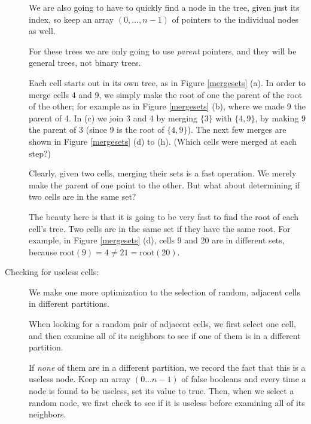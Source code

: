 \documentclass{article}
\newcommand{\set}[1]{\ensuremath{\{#1\}}}
\begin{document}
\begin{description}
  We are also going to have to quickly find a node in the tree, given
  just its index, so keep an array $(0,\ldots,n-1)$ of pointers to the
  individual nodes as well.

For these trees we are only going to use {\em parent} pointers, and
they will be general trees, not binary trees.

  Each cell starts out in its own tree, as in Figure \ref{mergesets}
  (a).  In order to merge cells 4 and 9, we simply make the root of one
  the parent of the root of the other; for example as in Figure
  \ref{mergesets} (b), where we made 9 the parent of 4.  In (c) we
  join 3 and 4 by 
  merging \set{3} with \set{4,9}, by making 9 the parent of 3 (since 9
  is the root of \set{4,9}).
  The next few merges are shown in Figure
  \ref{mergesets} (d) to (h).  (Which cells were merged at each step?)

Clearly, given two cells, merging their sets is a fast operation.  We
merely make the parent of one point to the other.  But what about
determining if two cells are in the same set?

The beauty here is that it is going to be very fast to find the root
of each cell's tree.  Two cells are in the same set if they have the
same root.  For example, in Figure \ref{mergesets} (d), cells 9 and 20
are in different sets, because $\mbox{root}(9) = 4 \not =
21 = \mbox{root}(20) $.


\item[Checking for useless cells:]  We make one more optimization to
  the selection of random, adjacent cells in different partitions.

  When looking for a random pair of adjacent cells, we first select
  one cell, and then examine all of its neighbors to see if one of
  them is in a different partition.  

If {\em none} of them are in a different partition, we record the fact
that this is a useless node.  Keep an array $(0...n-1)$ of false
booleans and every time a node is found to be useless, set its value
to true.  Then, when we select a random node, we first check to see if
it is useless before examining all of its neighbors.

\end{description}
\end{document}
